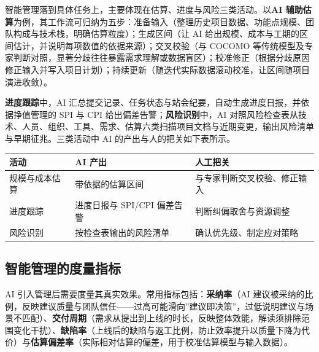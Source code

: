 \documentclass[
]{ctexbook}
\newcounter{none}
\begin{document}
智能管理落到具体任务上，主要体现在估算、进度与风险三类活动。以\textbf{AI
辅助估算}为例，其工作流可归纳为五步：准备输入（整理历史项目数据、功能点规模、团队构成与技术栈，明确估算粒度）；生成区间（让
AI
给出规模、成本与工期的区间估计，并说明每项数值的依据来源）；交叉校验（与
COCOMO
等传统模型及专家判断对照，显著分歧往往暴露需求理解或数据盲区）；校准修正（根据分歧原因修正输入并写入项目计划）；持续更新（随迭代实际数据滚动校准，让区间随项目演进收敛）。

\textbf{进度跟踪}中，AI
汇总提交记录、任务状态与站会纪要，自动生成进度日报，并依据挣值管理的 SPI
与 CPI 给出偏差告警；\textbf{风险识别}中，AI
对照风险检查表从技术、人员、组织、工具、需求、估算六类扫描项目文档与近期变更，输出风险清单与早期征兆。三类活动中
AI 的产出与人的把关如下表所示。

{\def\LTcaptype{none} %
\begin{longtable}[]{@{}lll@{}}
\toprule\noalign{}
活动 & AI 产出 & 人工把关 \\
\midrule\noalign{}
\endhead
\bottomrule\noalign{}
\endlastfoot
规模与成本估算 & 带依据的估算区间 & 与专家判断交叉校验、修正输入 \\
进度跟踪 & 进度日报与 SPI/CPI 偏差告警 & 判断纠偏取舍与资源调整 \\
风险识别 & 按检查表输出的风险清单 & 确认优先级、制定应对策略 \\
\end{longtable}
}

\subsection{智能管理的度量指标}\label{ux667aux80fdux7ba1ux7406ux7684ux5ea6ux91cfux6307ux6807}

AI 引入管理后需要度量其真实效果。常用指标包括：\textbf{采纳率}（AI
建议被采纳的比例，反映建议质量与团队信任------过高可能滑向''建议即决策''，过低说明建议与场景不匹配）、\textbf{交付周期}（需求从提出到上线的时长，反映整体效能，解读须排除范围变化干扰）、\textbf{缺陷率}（上线后的缺陷与返工比例，防止效率提升以质量下降为代价）与\textbf{估算偏差率}（实际相对估算的偏差，用于校准估算模型与输入数据）。
\end{document}
